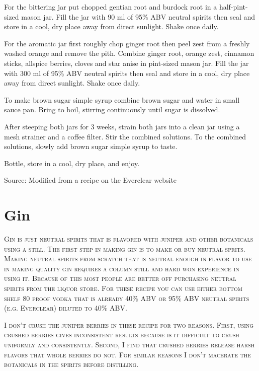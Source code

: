 \documentclass[letterpaper]{recipePMG}
\begin{document}
For the bittering jar put chopped gentian root and burdock root in a half-pint-sized mason jar.
Fill the jar with 90 ml of 95\% ABV neutral spirits then seal and store in a cool, dry place away from direct sunlight. Shake once daily.

For the aromatic jar first roughly chop ginger root then
peel zest from a freshly washed orange and remove the pith.
Combine ginger root, orange zest, cinnamon sticks, allspice berries, cloves and star anise in pint-sized mason jar.
Fill the jar with 300 ml of 95\% ABV neutral spirits then seal and store in a cool, dry place away from direct sunlight. Shake once daily.

To make brown sugar simple syrup 
combine brown sugar and water in small sauce pan. Bring to boil, stirring continuously until sugar is dissolved.


After steeping both jars for 3 weeks, strain both jars into a  clean jar using a mesh strainer and a coffee filter. Stir the combined solutions. To the combined solutions, slowly add
brown sugar simple syrup to taste.

Bottle, store in a cool, dry place, and enjoy.

Source: Modified from a recipe on the Everclear website

\chapter{Gin}


\textsc{Gin is just neutral spirits that is flavored with juniper and other botanicals using a still. The first step in making gin is to make or buy neutral sprits. Making neutral spirits from scratch that is neutral enough in flavor to use in making quality gin requires a column still and hard won experience in using it. Because of this most people are better off purchasing neutral spirits from the liquor store. For these recipe you can use either bottom shelf 80 proof vodka that is already 40\% ABV or 95\% ABV neutral spirits (e.g. Everclear) diluted to 40\% ABV.}

\textsc{I don't crush the juniper berries in these recipe for two reasons. First, using crushed berries gives inconsistent results because is it difficult to crush uniformly and consistently. Second, I find that crushed berries release harsh flavors that whole berries do not. For similar reasons I don't macerate the botanicals in the spirits before distilling.}
\end{document}
